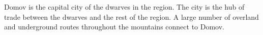 Domov is the capital city of the dwarves in the region.
The city is the hub of trade between the dwarves and the rest of the region.
A large number of overland and underground routes throughout the mountains connect to Domov.
